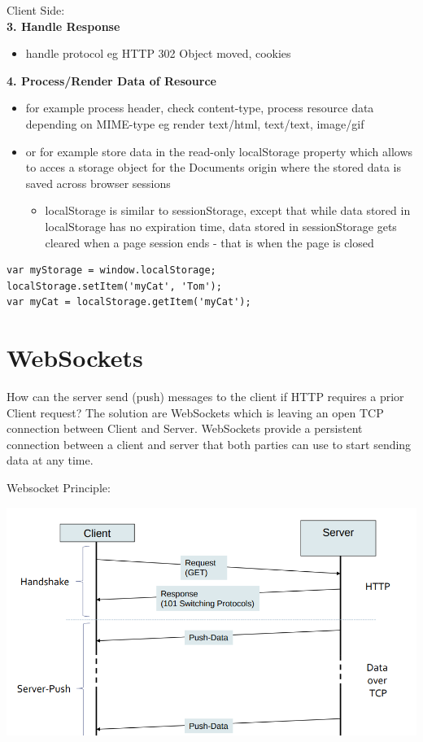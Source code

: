 \documentclass[11pt]{article}
\begin{document}
Client Side:\\
\textbf{3. Handle Response}
\begin{itemize}
\item handle protocol eg HTTP 302 Object moved, cookies
\end{itemize}
\textbf{4. Process/Render Data of Resource}
\begin{itemize}
\item for example process header, check content-type, process resource data depending on MIME-type eg render text/html, text/text, image/gif
\item or for example store data in the read-only localStorage property which allows to acces a storage object for the Documents origin where the stored data is saved across browser sessions
\begin{itemize}
\item localStorage is similar to sessionStorage, except that while data stored in localStorage has no expiration time, data stored in sessionStorage gets cleared when a page session ends - that is when the page is closed
\end{itemize}
\end{itemize}
\lstset{breaklines=true,language=javascript,label= ,caption= ,captionpos=b,numbers=none}
\begin{lstlisting}
var myStorage = window.localStorage;
localStorage.setItem('myCat', 'Tom');
var myCat = localStorage.getItem('myCat');
\end{lstlisting}

\section{WebSockets}
\label{sec:org4e8bf1b}
How can the server send (push) messages to the client if HTTP requires a prior Client request? The solution are WebSockets which is leaving an open TCP connection between Client and Server. WebSockets provide a persistent connection between a client and server that both parties can use to start sending data at any time.

Websocket Principle:\\
 \begin{center}
\includegraphics[width=.9\linewidth]{./ws-principle.png}
\end{center}
\end{document}
